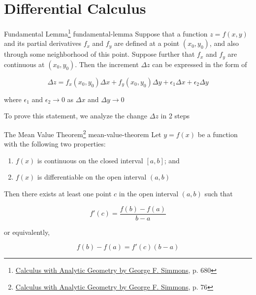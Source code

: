 \section{Differential Calculus}

\begin{Theorem}{
    Fundamental Lemma\footnote{\href{https://trello.com/c/byu9Pyy8}{Calculus with Analytic Geometry by George F. Simmons}, p. 680}
}{fundamental-lemma}
    Suppose that a function $z = f(x, y)$ and its partial derivatives $f_x$ and $f_y$ are defined at a point
    $(x_0, y_0)$, and also through some neighborhood of this point. Suppose further that $f_x$ and $f_y$ are continuous
    at $(x_0, y_0)$. Then the increment $\Delta z$ can be expressed in the form of

    \begin{equation}
        \Delta z = f_x(x_0, y_0)\Delta x + f_y(x_0, y_0)\Delta y + \epsilon_1\Delta x + \epsilon_2\Delta y
    \end{equation}

    where $\epsilon_1$ and $\epsilon_2 \rightarrow 0$ as $\Delta x$ and $\Delta y \rightarrow 0$
\end{Theorem}

To prove this statement, we analyze the change $\Delta z$ in 2 steps


\begin{Theorem}{
    The Mean Value Theorem\footnote{\href{https://trello.com/c/byu9Pyy8}{Calculus with Analytic Geometry by George F. Simmons}, p. 76}
}{mean-value-theorem}
    Let $y = f(x)$ be a function with the following two properties:

    \begin{enumerate}
        \item $f(x)$ is continuous on the closed interval $[a, b]$; and
        \item $f(x)$ is differentiable on the open interval $(a, b)$
    \end{enumerate}

    Then there exists at least one point $c$ in the open interval $(a, b)$ such that

    \[
        f'(c) = \frac{f(b) - f(a)}{b - a}
    \]

    or equivalently,

    \[
        f(b) - f(a) = f'(c)(b - a)
    \]
\end{Theorem}

